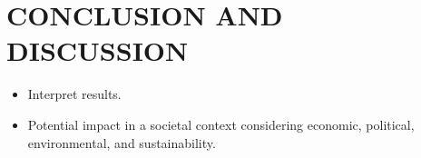 \chapter{CONCLUSION AND DISCUSSION}
\label{chapter:method}
\begin{itemize}
\item Interpret results.
\item Potential impact in a societal context considering economic, political, environmental, and sustainability.
\end{itemize}
